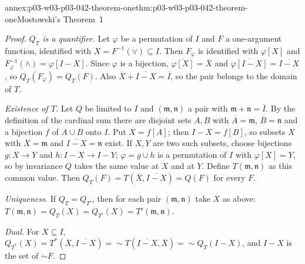 \begin{annexitem}{annex:p03-w03-p03-042-theorem-one}{thm:p03-w03-p03-042-theorem-one}{Mostowski's Theorem~1}
\begin{proof}
\emph{\(Q_T\) is a quantifier.}  Let \(\varphi\) be a permutation of
\(I\) and \(F\) a one-argument function, identified with
\(X=F^{-1}(\vee)\subseteq I\).  Then \(F_\varphi\) is identified with
\(\varphi[X]\) and \(F_\varphi^{-1}(\wedge)=\varphi[I-X]\).  Since
\(\varphi\) is a bijection, \(\overline{\varphi[X]}=\overline X\) and
\(\overline{\varphi[I-X]}=\overline{I-X}\), so \(Q_T(F_\varphi)=Q_T(F)\).
Also \(\overline X+\overline{I-X}=\overline I\), so the pair belongs to
the domain of \(T\).

\emph{Existence of \(T\).}  Let \(Q\) be limited to \(I\) and
\((\mathfrak m,\mathfrak n)\) a pair with \(\mathfrak m+\mathfrak n=
\overline I\).  By the definition of the cardinal sum there are disjoint
sets \(A,B\) with \(\overline A=\mathfrak m\), \(\overline B=\mathfrak n\)
and a bijection \(f\) of \(A\cup B\) onto \(I\).  Put \(X=f[A]\); then
\(I-X=f[B]\), so subsets \(X\) with \(\overline X=\mathfrak m\) and
\(\overline{I-X}=\mathfrak n\) exist.  If \(X,Y\) are two such subsets,
choose bijections \(g:X\to Y\) and \(h:I-X\to I-Y\); \(\varphi=g\cup h\) is
a permutation of \(I\) with \(\varphi[X]=Y\), so by invariance \(Q\) takes
the same value at \(X\) and at \(Y\).  Define \(T(\mathfrak m,\mathfrak
n)\) as this common value.  Then \(Q_T(F)=T(\overline X,\overline{I-X})=
Q(F)\) for every \(F\).

\emph{Uniqueness.}  If \(Q_T=Q_{T'}\), then for each pair
\((\mathfrak m,\mathfrak n)\) take \(X\) as above:
\(T(\mathfrak m,\mathfrak n)=Q_T(X)=Q_{T'}(X)=T'(\mathfrak m,\mathfrak n)\).

\emph{Dual.}  For \(X\subseteq I\),
\(Q_{T^*}(X)=T^{*}(\overline X,\overline{I-X})={\sim}T(\overline{I-X},
\overline X)={\sim}Q_T(I-X)\), and \(I-X\) is the set of \({\sim}F\).
\end{proof}
\end{annexitem}

